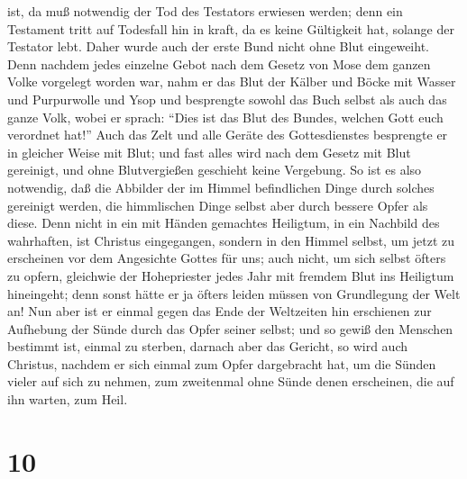 ist, da muß notwendig der Tod des Testators erwiesen werden;
 denn ein Testament tritt auf Todesfall hin in kraft, da
es keine Gültigkeit hat, solange der Testator lebt. 
Daher wurde auch der erste Bund nicht ohne Blut eingeweiht.
 Denn nachdem jedes einzelne Gebot nach dem Gesetz von
Mose dem ganzen Volke vorgelegt worden war, nahm er das Blut der Kälber
und Böcke mit Wasser und Purpurwolle und Ysop und besprengte sowohl das
Buch selbst als auch das ganze Volk,  wobei er sprach:
``Dies ist das Blut des Bundes, welchen Gott euch verordnet hat!''
 Auch das Zelt und alle Geräte des Gottesdienstes
besprengte er in gleicher Weise mit Blut;  und fast alles
wird nach dem Gesetz mit Blut gereinigt, und ohne Blutvergießen
geschieht keine Vergebung.  So ist es also notwendig, daß
die Abbilder der im Himmel befindlichen Dinge durch solches gereinigt
werden, die himmlischen Dinge selbst aber durch bessere Opfer als diese.
 Denn nicht in ein mit Händen gemachtes Heiligtum, in ein
Nachbild des wahrhaften, ist Christus eingegangen, sondern in den Himmel
selbst, um jetzt zu erscheinen vor dem Angesichte Gottes für uns;
 auch nicht, um sich selbst öfters zu opfern, gleichwie
der Hohepriester jedes Jahr mit fremdem Blut ins Heiligtum hineingeht;
denn sonst hätte er ja öfters leiden müssen von Grundlegung der Welt an!
 Nun aber ist er einmal gegen das Ende der Weltzeiten hin
erschienen zur Aufhebung der Sünde durch das Opfer seiner selbst;
 und so gewiß den Menschen bestimmt ist, einmal zu
sterben, darnach aber das Gericht,  so wird auch
Christus, nachdem er sich einmal zum Opfer dargebracht hat, um die
Sünden vieler auf sich zu nehmen, zum zweitenmal ohne Sünde denen
erscheinen, die auf ihn warten, zum Heil.

\hypertarget{section-9}{%
\section{10}\label{section-9}}

